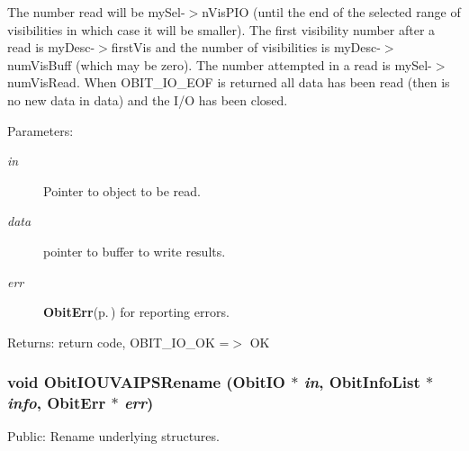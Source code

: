 The number read will be my\-Sel-$>$n\-Vis\-PIO (until the end of the selected range of visibilities in which case it will be smaller). The first visibility number after a read is my\-Desc-$>$first\-Vis and the number of visibilities is my\-Desc-$>$num\-Vis\-Buff (which may be zero). The number attempted in a read is my\-Sel-$>$num\-Vis\-Read. When OBIT\_\-IO\_\-EOF is returned all data has been read (then is no new data in data) and the I/O has been closed. \begin{Desc}
\item[Parameters:]
\begin{description}
\item[{\em in}]Pointer to object to be read. \item[{\em data}]pointer to buffer to write results. \item[{\em err}]{\bf Obit\-Err}{\rm (p.\,\pageref{structObitErr})} for reporting errors. \end{description}
\end{Desc}
\begin{Desc}
\item[Returns:]return code, OBIT\_\-IO\_\-OK =$>$ OK \end{Desc}
\subsubsection{\setlength{\rightskip}{0pt plus 5cm}void Obit\-IOUVAIPSRename ({\bf Obit\-IO} $\ast$ {\em in}, {\bf Obit\-Info\-List} $\ast$ {\em info}, {\bf Obit\-Err} $\ast$ {\em err})}\label{ObitIOUVAIPS_8h_a7}


Public: Rename underlying structures. 

